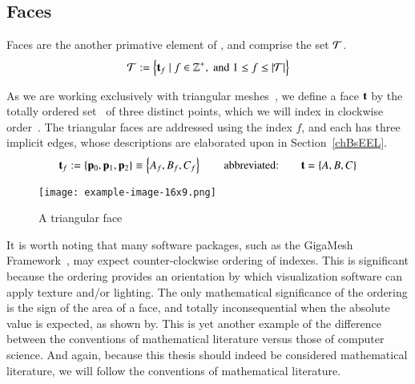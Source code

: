 %
\subsection{Faces}
\label{chBsF}
Faces are the another primative element of \tdd{}, and comprise the set $\mathcal{T}$.
\begin{equation}
	\mathcal{T} := \left \{\mathbf{t}_f \mid f \in \mathbb{Z}^+, \;\text{and}\; 1\leq f \leq|\mathcal{T}| \right \}
	\label{eq:defineSetOfFaces}
\end{equation}%
%
%
%

As we are working exclusively with triangular meshes~\cite[p.~26]{Mara12}, we define a face $\mathbf{t}$ by the totally ordered set~\cite{Weisstein19a} of three distinct points, which we will index in clockwise order~\cite[p.~4]{Mara17}. The triangular faces are addressed using the index $f$, and each has three implicit edges, whose descriptions are elaborated upon in Section~\ref{chBsEEL}.
\begin{equation}
	\mathbf{t}_f := \left \{\mathbf{p}_0, \mathbf{p}_1, \mathbf{p}_2\right \} \equiv \left \{A_f, B_f, C_f\right \} \hspace{20pt}\text{abbreviated:}\hspace{20pt} \mathbf{t} = \left \{A, B, C\right \}
	\label{eq:defineSetOfFaces}
\end{equation}%
%
%

\begin{figure}[ht]
\ffigbox
	{\texttt{[image: example-image-16x9.png]}}
	{\caption[A Triangular Face]{A triangular face}\label{fig:facesOfAMesh}}
\end{figure}%

It is worth noting that many software packages, such as the GigaMesh Framework~\cite[p.~89]{Mara12}, may expect counter-clockwise ordering of indexes. This is significant because the ordering provides an orientation by which visualization software can apply texture and/or lighting. The only mathematical significance of the ordering is the sign of the area of a face, and totally inconsequential when the absolute value is expected, as shown by\cite[p.~2]{Braden86}. This is yet another example of the difference between the conventions of mathematical literature versus those of computer science. And again, because this thesis should indeed be considered mathematical literature, we will follow the conventions of mathematical literature.
%
